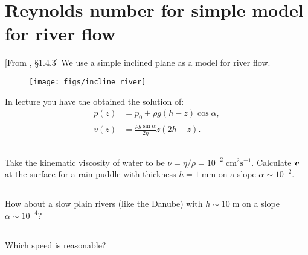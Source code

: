 \documentclass[11pt,letterpaper]{article}
\begin{document}
\section{Reynolds number for simple model for river flow}
[From \cite{Falkovich_18}, \S 1.4.3] 
We use a simple inclined plane as a model for river flow.
\begin{figure}[H]
    \centering
    \texttt{[image: figs/incline\_river]}
\end{figure}

In lecture you have the obtained the solution of:
\begin{align}
    p(z) &= p_0+\rho g(h-z)\cos\alpha,\\
    v(z) &= \frac{\rho g\sin\alpha}{2\eta}z(2h-z).
\end{align}




\subsection{}
Take the kinematic viscosity of water to be $\nu = \eta/\rho = 10^{-2}\;\text{cm}^2\text{s}^{-1}$. Calculate $\boldsymbol{v}$ at the surface for a rain puddle with thickness $h = 1\;\text{mm}$ on a slope $\alpha\sim 10^{-2}$.

\subsection{}
How about a slow plain rivers (like the Danube) with $h \sim 10\;\text{m}$ on a slope $\alpha\sim 10^{-4}$?

\subsection{}
Which speed is reasonable?
\end{document}
